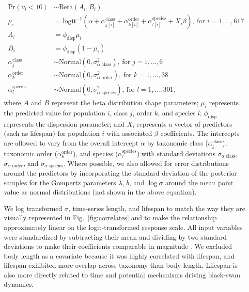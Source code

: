 \begin{align*}
\mathrm{Pr}(\nu_i < 10) &\sim \mathrm{Beta}(A_i, B_i)\\
\mu_i &= \mathrm{logit}^{-1}(\alpha
  + \alpha^\mathrm{class}_{j[i]}
  + \alpha^\mathrm{order}_{k[i]}
  + \alpha^\mathrm{species}_{l[i]}
  + X_i \beta),
  \: \text{for } i = 1, \dots, 617\\
A_i &= \phi_\mathrm{disp} \mu_i\\
B_i &= \phi_\mathrm{disp} (1 - \mu_i)\\
\alpha^\mathrm{class}_j &\sim
  \mathrm{Normal}(0, \sigma^2_{\alpha \; \mathrm{class}}),
  \: \text{for } j = 1, \dots, 6\\
\alpha^\mathrm{order}_k &\sim
  \mathrm{Normal}(0, \sigma^2_{\alpha \; \mathrm{order}}),
  \: \text{for } k = 1, \dots, 38\\
\alpha^\mathrm{species}_l &\sim
  \mathrm{Normal}(0, \sigma^2_{\alpha \; \mathrm{species}}),
  \: \text{for } l = 1, \dots, 301,
\end{align*}
where $A$ and $B$ represent the beta distribution shape parameters; $\mu_i$
represents the predicted value for population $i$, class $j$, order $k$, and
species $l$; $\phi_\mathrm{disp}$ represents the dispersion parameter; and
$X_i$ represents a vector of predictors (such as lifespan) for population $i$
with associated $\beta$ coefficients. The intercepts are allowed to vary from
the overall intercept $\alpha$ by taxonomic class ($\alpha^\mathrm{class}_j$),
taxonomic order ($\alpha^\mathrm{order}_k$), and species
($\alpha^\mathrm{species}_l$) with standard deviations $\sigma_{\alpha \;
  \mathrm{class}}$, $\sigma_{\alpha \; \mathrm{order}}$, and $\sigma_{\alpha
  \; \mathrm{species}}$. Where possible, we also allowed for error
distributions around the predictors by incorporating the standard deviation of
the posterior samples for the Gompertz parameters $\lambda$, $b$, and $\log
\sigma$ around the mean point value as normal distributions (not shown in the
above equation).

We log transformed $\sigma$, time-series length, and lifespan to match the way
they are visually represented in Fig.~\ref{fig:correlates} and to make the
relationship approximately linear on the logit-transformed response scale. All
input variables were standardized by subtracting their mean and dividing by
two standard deviations to make their coefficients comparable in magnitude
\citep{gelman2008c}. We excluded body length as a covariate because it was
highly correlated with lifespan, and lifespan exhibited more overlap across
taxonomy than body length. Lifespan is also more directly related to time and
potential mechanisms driving black-swan dynamics.

